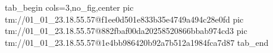  
 
 
 
 

\qqSecOrig


\ifcmt
  tab_begin cols=3,no_fig,center
    pic tm://01_01_23.18.55.57@f1ee0d501e833b35e4749a494c28e0fd
    pic tm://01_01_23.18.55.57@882fbaf00da20258520866bbab974cd3
    pic tm://01_01_23.18.55.57@1e4bb986420b92a7b512a1984fca7d87
  tab_end
\fi

